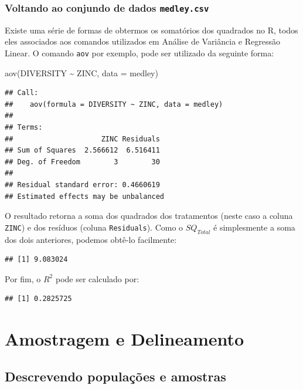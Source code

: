 \documentclass[
]{book}
\newenvironment{Shaded}{\begin{snugshade}}{\end{snugshade}}
\newcommand{\AttributeTok}[1]{\textcolor[rgb]{0.77,0.63,0.00}{#1}}
\newcommand{\FunctionTok}[1]{\textcolor[rgb]{0.00,0.00,0.00}{#1}}
\newcommand{\NormalTok}[1]{#1}
\newcommand{\SpecialCharTok}[1]{\textcolor[rgb]{0.00,0.00,0.00}{#1}}
\begin{document}
\hypertarget{voltando-ao-conjundo-de-dados-medley.csv}{%
\section{\texorpdfstring{Voltando ao conjundo de dados \texttt{medley.csv}}{Voltando ao conjundo de dados medley.csv}}\label{voltando-ao-conjundo-de-dados-medley.csv}}

Existe uma série de formas de obtermos os somatórios dos quadrados no R, todos eles associados aos comandos utilizados em Análise de Variância e Regressão Linear. O comando \texttt{aov} por exemplo, pode ser utilizado da seguinte forma:

\begin{Shaded}
\begin{Highlighting}[]
\FunctionTok{aov}\NormalTok{(DIVERSITY }\SpecialCharTok{\textasciitilde{}}\NormalTok{ ZINC, }\AttributeTok{data =}\NormalTok{ medley)}
\end{Highlighting}
\end{Shaded}

\begin{verbatim}
## Call:
##    aov(formula = DIVERSITY ~ ZINC, data = medley)
## 
## Terms:
##                     ZINC Residuals
## Sum of Squares  2.566612  6.516411
## Deg. of Freedom        3        30
## 
## Residual standard error: 0.4660619
## Estimated effects may be unbalanced
\end{verbatim}

O resultado retorna a soma dos quadrados dos tratamentos (neste caso a coluna \texttt{ZINC}) e dos resíduos (coluna \texttt{Residuals}). Como o \(SQ_{Total}\) é simplesmente a soma dos dois anteriores, podemos obtê-lo facilmente:

\begin{verbatim}
## [1] 9.083024
\end{verbatim}

Por fim, o \(R^2\) pode ser calculado por:

\begin{verbatim}
## [1] 0.2825725
\end{verbatim}

\hypertarget{part-amostragem-e-delineamento}{%
\part{Amostragem e Delineamento}\label{part-amostragem-e-delineamento}}

\hypertarget{popamostra}{%
\chapter{Descrevendo populações e amostras}\label{popamostra}}
\end{document}
